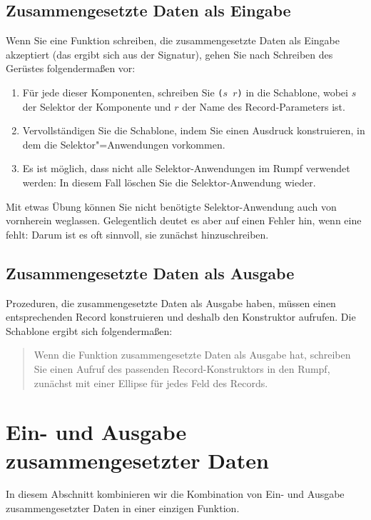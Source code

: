 \subsection{Zusammengesetzte Daten als Eingabe}

Wenn Sie eine Funktion schreiben, die zusammengesetzte Daten als
Eingabe akzeptiert (das ergibt sich aus der Signatur), gehen Sie nach
Schreiben des Gerüstes folgendermaßen vor:
%
\begin{enumerate}
\item Für jede dieser Komponenten, schreiben Sie  \texttt{($s$ $r$)} in die
  Schablone, wobei $s$ der Selektor der Komponente und $r$ der Name
  des Record-Parameters ist.
\item Vervollständigen Sie die Schablone, indem Sie einen Ausdruck
  konstruieren, in dem die Selektor"=Anwendungen vorkommen.
\item Es ist möglich, dass nicht alle Selektor-Anwendungen im Rumpf
  verwendet werden: In diesem Fall löschen Sie die Selektor-Anwendung
  wieder.
\end{enumerate}
%
Mit etwas Übung können Sie nicht benötigte Selektor-Anwendung auch
von vornherein weglassen.  Gelegentlich deutet es aber auf einen
Fehler hin, wenn eine fehlt: Darum ist es oft sinnvoll, sie zunächst
hinzuschreiben.

\subsection{Zusammengesetzte Daten als Ausgabe}

Prozeduren, die zusammengesetzte Daten als Ausgabe haben, müssen einen
entsprechenden Record konstruieren und deshalb den Konstruktor aufrufen.
Die Schablone ergibt sich folgendermaßen:
%
\begin{quote}
  Wenn die Funktion zusammengesetzte Daten als Ausgabe hat, schreiben
  Sie einen Aufruf des passenden Record-Konstruktors in den Rumpf,
  zunächst mit einer Ellipse für jedes Feld des Records.
\end{quote}

\section{Ein- und Ausgabe zusammengesetzter Daten}
\label{sec:armadillo}

In diesem Abschnitt kombinieren wir die Kombination von Ein- und
Ausgabe zusammengesetzter Daten in einer einzigen Funktion.

